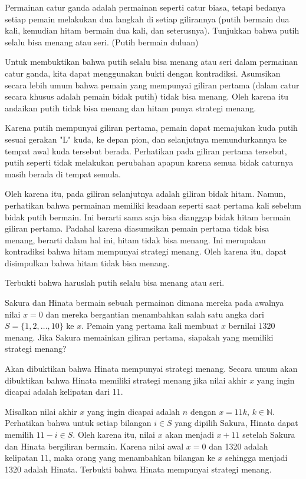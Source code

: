 \documentclass[11pt]{scrartcl}
\begin{document}
\begin{soaljawab}
Permainan catur ganda adalah permainan seperti catur biasa, tetapi bedanya setiap pemain melakukan dua langkah di setiap gilirannya (putih bermain dua kali, kemudian hitam bermain dua kali, dan seterusnya). Tunjukkan bahwa putih selalu bisa menang atau seri. (Putih bermain duluan)
    \begin{solusi}
        Untuk membuktikan bahwa putih selalu bisa menang atau seri dalam permainan catur ganda, kita dapat menggunakan bukti dengan kontradiksi. Asumsikan secara lebih umum bahwa pemain yang mempunyai giliran pertama (dalam catur secara khusus adalah pemain bidak putih) tidak bisa menang. Oleh karena itu andaikan putih tidak bisa menang dan hitam punya strategi menang.
        
        Karena putih mempunyai giliran pertama, pemain dapat memajukan kuda putih sesuai gerakan "L" kuda, ke depan pion, dan selanjutnya memundurkannya ke tempat awal kuda tersebut berada. Perhatikan pada giliran pertama tersebut, putih seperti tidak melakukan perubahan apapun karena semua bidak caturnya masih berada di tempat semula. 
        
        Oleh karena itu, pada giliran selanjutnya adalah giliran bidak hitam. Namun, perhatikan bahwa permainan memiliki keadaan seperti saat pertama kali sebelum bidak putih bermain. Ini berarti sama saja bisa dianggap bidak hitam bermain giliran pertama. Padahal karena diasumsikan pemain pertama tidak bisa menang, berarti dalam hal ini, hitam tidak bisa menang. Ini merupakan kontradiksi bahwa hitam mempunyai strategi menang. Oleh karena itu, dapat disimpulkan bahwa hitam tidak bisa menang.

        Terbukti bahwa haruslah putih selalu bisa menang atau seri.
    \end{solusi}
\end{soaljawab}

\begin{soaljawab}
Sakura dan Hinata bermain sebuah permainan dimana mereka pada awalnya nilai $x=0$ dan mereka bergantian menambahkan salah satu angka dari $S=\{1,2,\dots,10\}$ ke $x$. Pemain yang pertama kali membuat $x$ bernilai $1320$ menang. Jika Sakura memainkan giliran pertama, siapakah yang memiliki strategi menang?
    \begin{solusi}
        Akan dibuktikan bahwa Hinata mempunyai strategi menang. Secara umum akan dibuktikan bahwa Hinata memiliki strategi menang jika nilai akhir $x$ yang ingin dicapai adalah kelipatan dari 11. 

        Misalkan nilai akhir $x$ yang ingin dicapai adalah $n$ dengan $x=11k$, $k \in \mathbb{N}$. Perhatikan bahwa untuk setiap bilangan $i \in S$ yang dipilih Sakura, Hinata dapat memilih $11-i \in S$. Oleh karena itu, nilai $x$ akan menjadi $x+11$ setelah Sakura dan Hinata bergiliran bermain. Karena nilai awal $x=0$ dan 1320 adalah kelipatan 11, maka orang yang menambahkan bilangan ke $x$ sehingga menjadi 1320 adalah Hinata. Terbukti bahwa Hinata mempunyai strategi menang.
    \end{solusi}
\end{soaljawab}
\end{document}
